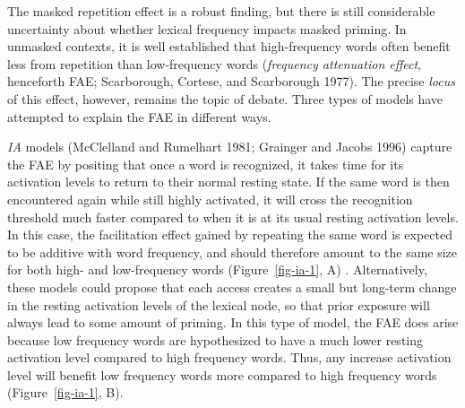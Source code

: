 \documentclass[
]{interact}
\begin{document}
The masked repetition effect is a robust finding, but there is still
considerable uncertainty about whether lexical frequency impacts masked
priming. In unmasked contexts, it is well established that
high-frequency words often benefit less from repetition than
low-frequency words (\emph{frequency attenuation effect}, henceforth
FAE; Scarborough, Cortese, and Scarborough 1977). The precise
\emph{locus} of this effect, however, remains the topic of debate. Three
types of models have attempted to explain the FAE in different ways.

\emph{IA} models (McClelland and Rumelhart 1981; Grainger and Jacobs
1996) capture the FAE by positing that once a word is recognized, it
takes time for its activation levels to return to their normal resting
state. If the same word is then encountered again while still highly
activated, it will cross the recognition threshold much faster compared
to when it is at its usual resting activation levels. {In this case, the
facilitation effect gained by repeating the same word is expected to be
additive with word frequency, and should therefore amount to the same
size for both high- and low-frequency words (Figure~\ref{fig-ia-1}, A)
}. Alternatively, these models could propose that each access creates a
small but long-term change in the resting activation levels of the
lexical node, so that prior exposure will always lead to some amount of
priming. In this type of model, the FAE does arise because low frequency
words are hypothesized to have a much lower resting activation level
compared to high frequency words. Thus, any increase activation level
will benefit low frequency words more compared to high frequency words
(Figure~\ref{fig-ia-1}, B).
\end{document}
